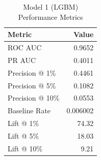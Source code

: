 \begin{table}[h]
\centering
\begin{tabular}{lr}
\toprule
Metric & Value \\
\midrule
ROC AUC & 0.9652 \\
PR AUC & 0.4011 \\
Precision @ 1\% & 0.4461 \\
Precision @ 5\% & 0.1082 \\
Precision @ 10\% & 0.0553 \\
Baseline Rate & 0.006002 \\
Lift @ 1\% & 74.32 \\
Lift @ 5\% & 18.03 \\
Lift @ 10\% & 9.21 \\
\bottomrule
\end{tabular}
\caption{Model 1 (LGBM) Performance Metrics}
\label{tab:model1_lgbm_metrics}
\end{table}
